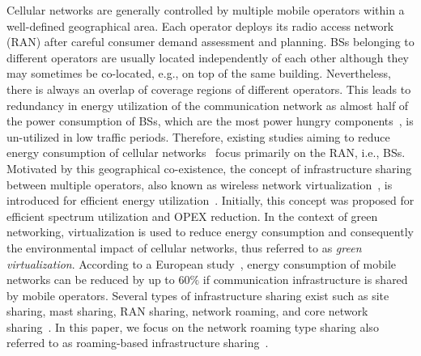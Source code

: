 \documentclass[10pt, letter, twocolumn]{IEEEtran}
\begin{document}
Cellular networks are generally controlled by multiple mobile operators within a well-defined geographical area. Each operator deploys its radio access network (RAN) after careful consumer demand assessment and planning. BSs belonging to different operators are usually located independently of each other although they may sometimes be co-located, e.g., on top of the same building. Nevertheless, there is always an overlap of coverage regions of different operators. This leads to redundancy in energy utilization of the communication network as almost half of the power consumption of BSs, which are the most power hungry components~\cite{manifesto}, is un-utilized in low traffic periods. Therefore, existing studies aiming to reduce energy consumption of cellular networks~\cite{green_survey,green_survey_2,cell_zooming} focus primarily on the RAN, i.e., BSs. Motivated by this geographical co-existence, the concept of infrastructure sharing between multiple operators, also known as wireless network virtualization~\cite{network_virtualization}, is introduced for efficient energy utilization~\cite{infrastructure_sharing_report,infrastructure_sharing}. Initially, this concept was proposed for efficient spectrum utilization and OPEX reduction. In the context of green networking, virtualization is used to reduce energy consumption and consequently the environmental impact of cellular networks, thus referred to as \emph{green virtualization}. According to a European study~\cite{network_sharing}, energy consumption of mobile networks can be reduced by up to 60$\%$ if communication infrastructure is shared by mobile operators. Several types of infrastructure sharing exist such as site sharing, mast sharing, RAN sharing, network roaming, and core network sharing~\cite{infrastructure_sharing_report}. In this paper, we focus on the network roaming type sharing also referred to as roaming-based infrastructure sharing~\cite{infrastructure_sharing}.
\end{document}
